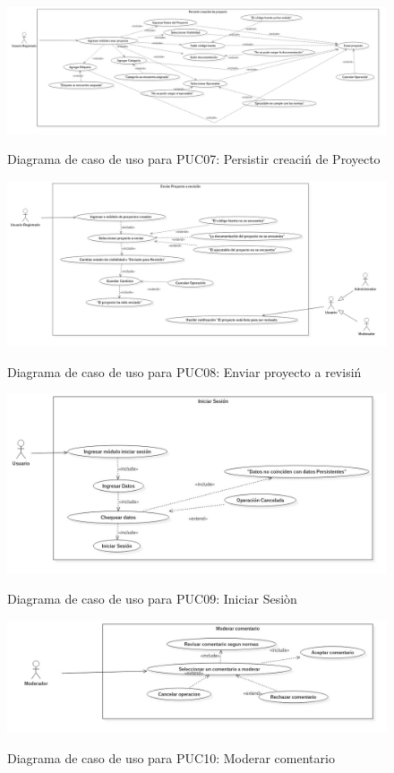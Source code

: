 \begin{figure}[!ht]
\includegraphics[width=\textwidth]{images/usecase/PUC07}
\label{FIG:CU_PUC07}
\caption{Diagrama de caso de uso para PUC07: Persistir creaci\'n de Proyecto}
\end{figure}

\begin{figure}[!ht]
\includegraphics[width=\textwidth]{images/usecase/PUC08}
\label{FIG:CU_PUC08}
\caption{Diagrama de caso de uso para PUC08: Enviar proyecto a revisi\'n}
\end{figure}

\begin{figure}[!ht]
\includegraphics[width=\textwidth]{images/usecase/PUC09}
\label{FIG:CU_PUC09}
\caption{Diagrama de caso de uso para PUC09: Iniciar Sesi\`on}
\end{figure}

\begin{figure}[!ht]
\includegraphics[width=\textwidth]{images/usecase/PUC10} %
\label{FIG:CU_PUC10}
\caption{Diagrama de caso de uso para PUC10: Moderar comentario}
\end{figure}

